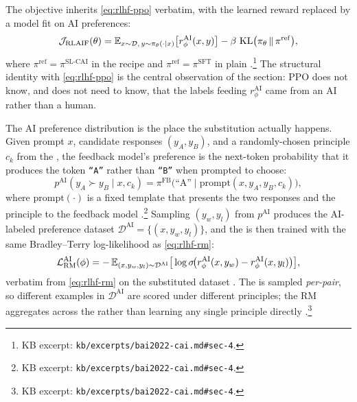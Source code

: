 The  objective inherits \cref{eq:rlhf-ppo} verbatim, with the
learned reward replaced by a model fit on AI preferences:
\begin{equation}
\mathcal{J}_{\mathrm{RLAIF}}(\theta)
  = \operatorname{\mathbb{E}}_{x \sim \mathcal{D},\, y \sim \pi_\theta(\cdot \mid x)}\!\big[r_\phi^{\mathrm{AI}}(x, y)\big]
    - \beta \, \operatorname{KL}\!\big(\pi_\theta \,\|\, \pi^{\mathrm{ref}}\big),
\label{eq:rlaif-objective}
\end{equation}
where $\pi^{\mathrm{ref}} = \pi^{\mathrm{SL\text{-}CAI}}$ in the 
recipe and $\pi^{\mathrm{ref}} = \pi^{\mathrm{SFT}}$ in plain 
\citep[\S 4]{bai2022-cai}.\footnote{KB excerpt:
\nolinkurl{kb/excerpts/bai2022-cai.md#sec-4}.} The structural identity
with \cref{eq:rlhf-ppo} is the central observation of the section:
PPO does not know, and does not need to know, that the labels feeding
$r_\phi^{\mathrm{AI}}$ came from an AI rather than a human.

The AI preference distribution is the place the substitution actually
happens. Given prompt $x$, candidate responses $(y_A, y_B)$, and a
randomly-chosen principle $c_k$ from the , the feedback
model's preference is the next-token probability that it produces the
token \texttt{``A''} rather than \texttt{``B''} when prompted to choose:
\begin{equation}
p^{\mathrm{AI}}(y_A \succ y_B \mid x, c_k)
  = \pi^{\mathrm{FB}}\!\big(\text{``A''} \mid \mathrm{prompt}(x, y_A, y_B, c_k)\big),
\label{eq:rlaif-pref}
\end{equation}
where $\mathrm{prompt}(\cdot)$ is a fixed template that presents the
two responses and the principle to the feedback model
\citep[\S 4]{bai2022-cai}.\footnote{KB excerpt:
\nolinkurl{kb/excerpts/bai2022-cai.md#sec-4}.} Sampling $(y_w, y_l)$
from $p^{\mathrm{AI}}$ produces the AI-labeled preference dataset
$\mathcal{D}^{\mathrm{AI}} = \{(x, y_w, y_l)\}$, and the 
is then trained with the same Bradley--Terry log-likelihood as
\cref{eq:rlhf-rm}:
\begin{equation}
\mathcal{L}_{\mathrm{RM}}^{\mathrm{AI}}(\phi)
  = -\operatorname{\mathbb{E}}_{(x, y_w, y_l) \sim \mathcal{D}^{\mathrm{AI}}}
       \!\big[\log \sigma\!\big(r_\phi^{\mathrm{AI}}(x, y_w) - r_\phi^{\mathrm{AI}}(x, y_l)\big)\big],
\label{eq:rlaif-rm}
\end{equation}
verbatim from \cref{eq:rlhf-rm} on the substituted dataset
\citep[\S 4]{bai2022-cai}. The  is sampled \emph{per-pair},
so different examples in $\mathcal{D}^{\mathrm{AI}}$ are scored under
different principles; the RM aggregates across the  rather
than learning any single principle directly
\citep[\S 4]{bai2022-cai}.\footnote{KB excerpt:
\nolinkurl{kb/excerpts/bai2022-cai.md#sec-4}.}

